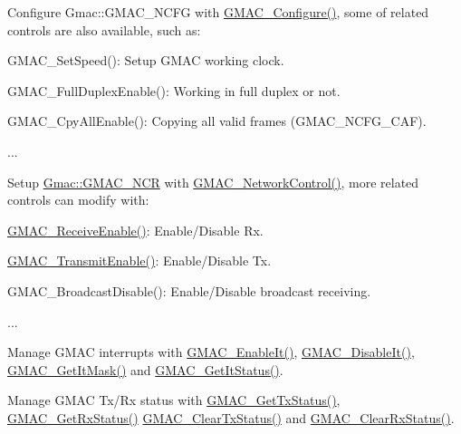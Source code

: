 \begin{DoxyItemize}
\item Configure Gmac\+::\+G\+M\+A\+C\+\_\+\+N\+C\+FG with \mbox{\hyperlink{group__gmac__defines_ga6939e2e68cc4b238caeab75414dd62b9}{G\+M\+A\+C\+\_\+\+Configure()}}, some of related controls are also available, such as\+:
\begin{DoxyItemize}
\item G\+M\+A\+C\+\_\+\+Set\+Speed()\+: Setup G\+M\+AC working clock.
\item G\+M\+A\+C\+\_\+\+Full\+Duplex\+Enable()\+: Working in full duplex or not.
\item G\+M\+A\+C\+\_\+\+Cpy\+All\+Enable()\+: Copying all valid frames (G\+M\+A\+C\+\_\+\+N\+C\+F\+G\+\_\+\+C\+AF).
\item ...
\end{DoxyItemize}
\item Setup \mbox{\hyperlink{structGmac_af7956c00f79851e10a1012e6ebae02ec}{Gmac\+::\+G\+M\+A\+C\+\_\+\+N\+CR}} with \mbox{\hyperlink{group__gmac__defines_ga4dfdc785358f1239d80a46dc2108a15c}{G\+M\+A\+C\+\_\+\+Network\+Control()}}, more related controls can modify with\+:
\begin{DoxyItemize}
\item \mbox{\hyperlink{group__gmac__defines_ga3caa9d3dc5ec1e3e32e9e017702ef51e}{G\+M\+A\+C\+\_\+\+Receive\+Enable()}}\+: Enable/\+Disable Rx.
\item \mbox{\hyperlink{group__gmac__defines_ga43e952eb0a8ec8d8131ac69b6a30842d}{G\+M\+A\+C\+\_\+\+Transmit\+Enable()}}\+: Enable/\+Disable Tx.
\item G\+M\+A\+C\+\_\+\+Broadcast\+Disable()\+: Enable/\+Disable broadcast receiving.
\item ...
\end{DoxyItemize}
\item Manage G\+M\+AC interrupts with \mbox{\hyperlink{group__gmac__defines_ga7ada4663e83402d9ca6da62f166e115f}{G\+M\+A\+C\+\_\+\+Enable\+It()}}, \mbox{\hyperlink{group__gmac__defines_ga6c39b23fa0f7760458941d6a5bf90669}{G\+M\+A\+C\+\_\+\+Disable\+It()}}, \mbox{\hyperlink{group__gmac__defines_ga3b19788339e3ea42396e5dac9ae4764f}{G\+M\+A\+C\+\_\+\+Get\+It\+Mask()}} and \mbox{\hyperlink{group__gmac__defines_ga9e845a27fa9a4f30f4f53684ca5934c5}{G\+M\+A\+C\+\_\+\+Get\+It\+Status()}}.
\item Manage G\+M\+AC Tx/\+Rx status with \mbox{\hyperlink{group__gmac__defines_gafba1535fac70522c3101326e020ca1d6}{G\+M\+A\+C\+\_\+\+Get\+Tx\+Status()}}, \mbox{\hyperlink{group__gmac__defines_gacf2a7803b8177d1ec6837d76de5c5e7a}{G\+M\+A\+C\+\_\+\+Get\+Rx\+Status()}} \mbox{\hyperlink{group__gmac__defines_ga620df07c4598d12a88be4e3715eafe7e}{G\+M\+A\+C\+\_\+\+Clear\+Tx\+Status()}} and \mbox{\hyperlink{group__gmac__defines_ga409a1719b06569ad5f4efe03d21ab1dd}{G\+M\+A\+C\+\_\+\+Clear\+Rx\+Status()}}.

\end{DoxyItemize}
